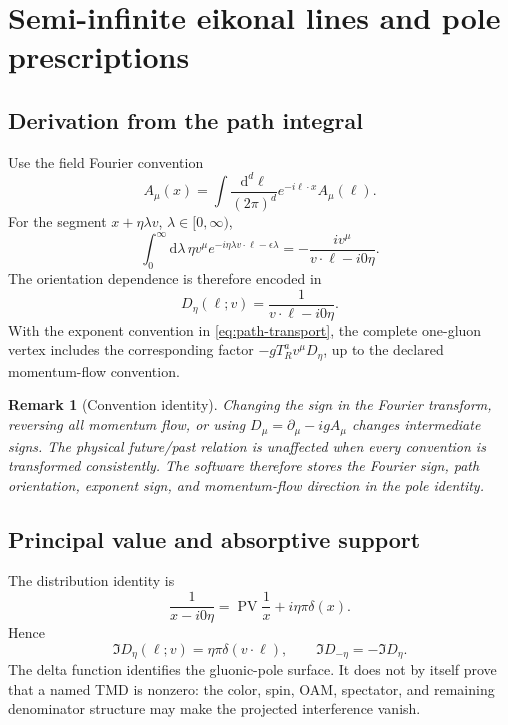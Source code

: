 \documentclass[11pt]{article}
\newtheorem{remark}[definition]{Remark}
\newcommand{\dd}{\mathrm{d}}
\newcommand{\PV}{\operatorname{PV}}
\begin{document}
\section{Semi-infinite eikonal lines and pole prescriptions}
\label{sec:eikonal-poles}

\subsection{Derivation from the path integral}

Use the field Fourier convention
\begin{equation}
 A_\mu(x)=\int\frac{\dd^d\ell}{(2\pi)^d}
 e^{-i\ell\cdot x}A_\mu(\ell).
\label{eq:gauge-field-fourier}
\end{equation}
For the segment \(x+\eta\lambda v\), \(\lambda\in[0,\infty)\),
\begin{equation}
 \int_0^\infty\dd\lambda\,\eta v^\mu
 e^{-i\eta\lambda v\cdot\ell-\epsilon\lambda}
 =-\frac{i v^\mu}{v\cdot\ell-i0\eta}.
\label{eq:semi-infinite-integral}
\end{equation}
The orientation dependence is therefore encoded in
\begin{equation}
 D_\eta(\ell;v)
 =\frac{1}{v\cdot\ell-i0\eta}.
\label{eq:eikonal-denominator}
\end{equation}
With the exponent convention in \cref{eq:path-transport}, the complete
one-gluon vertex includes the corresponding factor \(-gT_R^av^\mu
D_\eta\), up to the declared momentum-flow convention.

\begin{remark}[Convention identity]
Changing the sign in the Fourier transform, reversing all momentum flow, or
using \(D_\mu=\partial_\mu-igA_\mu\) changes intermediate signs.  The physical
future/past relation is unaffected when every convention is transformed
consistently.  The software therefore stores the Fourier sign, path
orientation, exponent sign, and momentum-flow direction in the pole identity.
\end{remark}

\subsection{Principal value and absorptive support}

The distribution identity is
\begin{equation}
 \frac{1}{x-i0\eta}
 =\PV\frac1x+i\eta\pi\delta(x).
\label{eq:eikonal-distribution-identity}
\end{equation}
Hence
\begin{equation}
 \Im D_\eta(\ell;v)
 =\eta\pi\delta(v\cdot\ell),
 \qquad
 \Im D_{-\eta}=-\Im D_\eta.
\label{eq:eikonal-imaginary}
\end{equation}
The delta function identifies the gluonic-pole surface.  It does not by
itself prove that a named TMD is nonzero: the color, spin, OAM, spectator,
and remaining denominator structure may make the projected interference
vanish.
\end{document}
